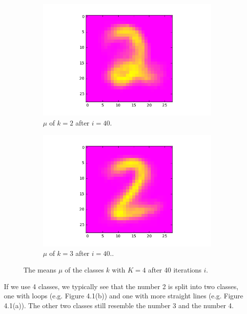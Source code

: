 \documentclass[a4paper,10pt]{article}
\numberwithin{equation}{section} %
\numberwithin{figure}{section} %
\numberwithin{table}{section} %
\theoremstyle{mytheor}
\begin{document}
\begin{enumerate}
\begin{figure}[h!]
\begin{subfigure}[b]{0.24\textwidth}
				\includegraphics[width=\textwidth]{digits/39_k4_class2.png}\vspace{-0.4cm}
				\caption{$\mu$ of $k=2$ after $i=40$.}
			\end{subfigure}
			\begin{subfigure}[b]{0.24\textwidth}
				\includegraphics[width=\textwidth]{digits/39_k4_class3.png}\vspace{-0.4cm}
				\caption{$\mu$ of $k=3$ after $i=40$..}
			\end{subfigure}
   			\caption{\vspace{-0.1cm} The means $\mu$ of the classes $k$ with $K = 4$ after 40 iterations $i$.}\vspace{-0.2cm}
  		\end{figure}
		If we use 4 classes, we typically see that the number 2 is split into two classes, one with loops (e.g. Figure 4.1(b)) and one with more straight lines (e.g. Figure 4.1(a)). The other two classes still resemble the number 3 and the number 4.


\end{enumerate}
\end{document}
